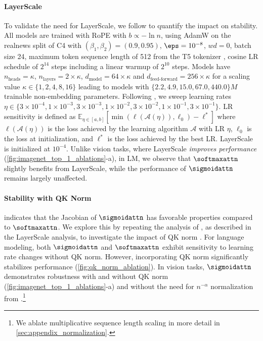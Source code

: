 \paragraph{LayerScale} To validate the need for LayerScale, we follow \citet{DBLP:journals/corr/abs-2309-14322} to quantify the impact on stability.
All models are trained with RoPE with $b \propto -\ln n$, using AdamW  \citep{loshchilov2017decoupled} on the 
realnews split of C4 
with $(\beta_1,\beta_2)=(0.9, 0.95)$, $\eps=10^{-8}$,  $wd=0$, 
batch size 24, maximum token sequence length of 512 from the T5 tokenizer \citep{DBLP:journals/jmlr/RaffelSRLNMZLL20}, cosine LR schedule of $2^{14}$ steps including a linear warmup of $2^{10}$ steps. 
Models have 
$n_{\text{heads}}=\kappa$,
$n_{\text{layers}}=2\times \kappa$,
$d_{\text{model}}=64\times \kappa$ and
$d_{\text{feed-forward}}=256\times\kappa$
for a scaling value $\kappa\in\{1,2,4,8,16\}$
leading to models with $\{2.2, 4.9,15.0,67.0,440.0\}M$ trainable non-embedding parameters.
Following \citet{DBLP:journals/corr/abs-2309-14322},
we sweep learning rates
$\eta\in \{3\times 10^{-4}, 1\times 10^{-3}, 3\times 10^{-3}, 1\times 10^{-2}, 3\times 10^{-2}, 1\times 10^{-1}, 3\times 10^{-1}\}$.
LR sensitivity is defined as 
$\mathbb E_{\eta\in[a,b]}\left[\min(\ell(\mathcal A(\eta)),\ell_0)-\ell^*\right]$
where $\ell(\mathcal A(\eta))$ is the loss achieved by the learning algorithm $\mathcal A$ with LR $\eta$,
$\ell_0$ is the loss at initialization, and
$\ell^*$ is the loss achieved by the best LR.
LayerScale is initialized at $10^{-4}$. 
Unlike vision tasks, where LayerScale \emph{improves performance} (\cref{fig:imagenet_top_1_ablations}-a), in LM, we observe that $\softmaxattn$ slightly benefits from LayerScale, while the performance of $\sigmoidattn$ remains largely unaffected.
\paragraph{Stability with QK Norm}  indicates that the Jacobian of $\sigmoidattn$ has favorable properties compared to $\softmaxattn$. We explore this by repeating the analysis of \citet{DBLP:journals/corr/abs-2309-14322}, as described in the LayerScale analysis, to investigate the impact of QK norm \citep{DBLP:conf/icml/0001DMPHGSCGAJB23}. For language modeling, both $\sigmoidattn$ and $\softmaxattn$ exhibit sensitivity to learning rate changes without QK norm. However, incorporating QK norm significantly stabilizes performance (\cref{fig:qk_norm_ablation}). In vision tasks, $\sigmoidattn$ demonstrates robustness with and without QK norm (\cref{fig:imagenet_top_1_ablations}-a) and without the need for $n^{-\alpha}$ normalization from \citet{wortsman2023replacing}.\footnote{We ablate multiplicative sequence length scaling in more detail in \cref{sec:appendix_normalization}.}

